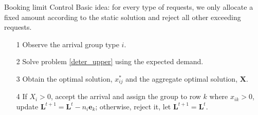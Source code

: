       \begin{frame}{Booking limit Control}
        Basic idea: for every type of requests, we only allocate a fixed amount according to the static solution and reject all other exceeding requests.
        \begin{itemize}
          \item[1] Observe the arrival group type $i$.
          \item[2] Solve problem \eqref{deter_upper} using the expected demand.
          \item[3] Obtain the optimal solution, $x_{ij}^{*}$ and the aggregate optimal solution, $\mathbf{X}$.
          \item[4] If $X_{i} > 0$, accept the arrival and assign the group to row $k$ where $x_{ik} > 0$, update $\mathbf{L}^{t+1} = \mathbf{L}^{t} - n_i \mathbf{e}_{k}$; otherwise, reject it, let $\mathbf{L}^{t+1} = \mathbf{L}^{t}$.
        \end{itemize}
                 
      \end{frame}